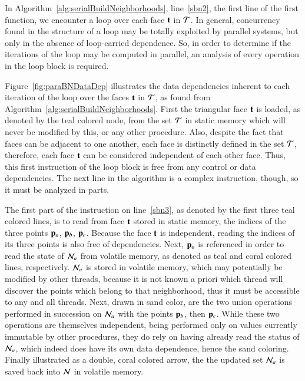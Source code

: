 In Algorithm~\ref{alg:serialBuildNeighborhoods}, line~\ref{sbn2}, the first line of the first function, we encounter a loop over each face $\mathbf{t}$ in $\mathcal{T}$. In general, concurrency found in the structure of a loop may be totally exploited by parallel systems, but only in the absence of loop-carried dependence. So, in order to determine if the iterations of the loop may be computed in parallel, an analysis of every operation in the loop block is required.

Figure~\ref{fig:paraBNDataDep} illustrates the data dependencies inherent to each iteration of the loop over the faces $\mathbf{t}$ in $\mathcal{T}$, as found from Algorithm~\ref{alg:serialBuildNeighborhoods}. First the triangular face $\mathbf{t}$ is loaded, as denoted by the teal colored node, from the set $\mathcal{T}$ in static memory which will never be modified by this, or any other procedure. Also, despite the fact that faces can be adjacent to one another, each face is distinctly defined in the set $\mathcal{T}$, therefore, each face $\mathbf{t}$ can be considered independent of each other face. Thus, this first instruction of the loop block is free from any control or data dependencies. The next line in the algorithm is a complex instruction, though, so it must be analyzed in parts.

The first part of the instruction on line~\ref{sbn3}, as denoted by the first three teal colored lines, is to read from face $\mathbf{t}$ stored in static memory, the indices of the three points $\mathbf{p}_a$, $\mathbf{p}_b$, $\mathbf{p}_c$. Because the face $\mathbf{t}$ is independent, reading the indices of its three points is also free of dependencies. Next, $\mathbf{p}_a$ is referenced in order to read the state of $\mathcal{N}_a$ from volatile memory, as denoted as teal and coral colored lines, respectively. $\mathcal{N}_a$ is stored in volatile memory, which may potentially be modified by other threads, because it is not known a priori which thread will discover the points which belong to that neighborhood, thus it must be accessible to any and all threads. Next, drawn in sand color, are the two union operations performed in succession on $\mathcal{N}_a$ with the points $\mathbf{p}_b$, then $\mathbf{p}_c$. While these two operations are themselves independent, being performed only on values currently immutable by other procedures, they do rely on having already read the status of $\mathcal{N}_a$, which indeed does have its own data dependence, hence the sand coloring. Finally illustrated as a double, coral colored arrow, the  the updated set $\mathcal{N}_a$ is saved back into $\mathcal{N}$ in volatile memory.


